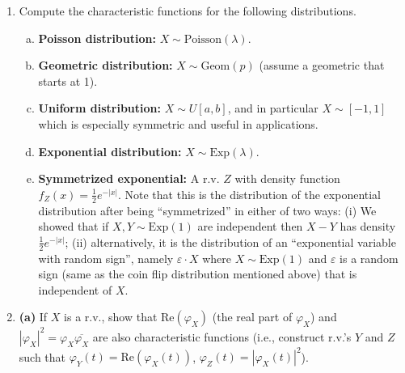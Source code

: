 \documentclass[12pt]{article}
\theoremstyle{example}
\begin{document}
\begin{enumerate}
\medskip \noindent (b) Show that $\sqrt{n} X_{n,1} \implies N(0,1)$ as $n\to\infty$.

\medskip \noindent\textbf{Hint.} Use the law of large numbers.

\medskip \noindent (c) For each $n\ge 1$, find the density function of the coordinate $X_{n,1}$. Optionally, use this to give an alternative solution to part (b) above.

\medskip \noindent \textbf{Hint.} Do it first for $n=2$ and $n=3$, and generalize using ideas from multivariate calculus. For $n=3$, you should find that $X_{3,1} \sim U[-1,1]$, a geometric fact which was known to Archimedes.


\item Compute the characteristic functions for the following distributions.
\begin{enumerate}[(a)]
\item \textbf{Poisson distribution:} $X\sim \textrm{Poisson}(\lambda)$.
\item \textbf{Geometric distribution:} $X\sim \textrm{Geom}(p)$ (assume a geometric that starts at 1).
\item \textbf{Uniform distribution:} $X \sim U[a,b]$, and in particular $X\sim [-1,1]$ which is especially symmetric and useful in applications.
\item \textbf{Exponential distribution:} $X\sim \textrm{Exp}(\lambda)$.
\item \textbf{Symmetrized exponential:} A r.v. $Z$ with density function $f_Z(x) = \frac12 e^{-|x|}$. Note that this is the distribution of the exponential distribution after being ``symmetrized'' in either of two ways: (i) We showed that if $X,Y\sim \textrm{Exp}(1)$ are independent then $X-Y$ has density $\frac12 e^{-|x|}$; (ii) alternatively, it is the distribution of an ``exponential variable with random sign'', namely $\varepsilon\cdot X$ where $X\sim \textrm{Exp}(1)$ and $\varepsilon$ is a random sign (same as the coin flip distribution mentioned above) that is independent of $X$.
\end{enumerate}




\item \textbf{(a)} If $X$ is a r.v., show that $\textrm{Re}(\varphi_X)$ (the real part of $\varphi_X$) and $|\varphi_X|^2 = \varphi_X \overline{\varphi_X}$ are also characteristic functions (i.e., construct r.v.'s $Y$ and $Z$ such that 
$\varphi_Y(t) = \textrm{Re}(\varphi_X(t))$, $\varphi_Z(t) = |\varphi_X(t)|^2$).


\end{enumerate}
\end{document}
